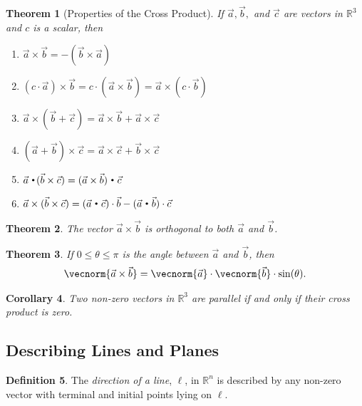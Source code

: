\documentclass{article}[11pt]
\newtheorem{theorem}{Theorem}[section]
\newtheorem{corollary}[theorem]{Corollary}
\theoremstyle{definition}
\newtheorem{definition}[theorem]{Definition}
\DeclareMathOperator*{\dotprod}{\scalerel*{\cdot}{\bigodot}}
\numberwithin{equation}{section}
\begin{document}
\begin{theorem}[Properties of the Cross Product]
	If \(\vec{a}, \vec{b},\) and \(\vec{c}\) are vectors in \( \mathbb{R}^3 \) and \(c\) is a scalar, then
	\begin{multicols}{2}
		\begin{enumerate}
			\item \( \vec{a} \times \vec{b}  = - (\vec{b} \times \vec{a}) \)
			\item \( (c\cdot\vec{a}) \times \vec{b} = c\cdot(\vec{a} \times \vec{b}) = \vec{a} \times (c\cdot \vec{b}) \)
			\item \( \vec{a} \times ( \vec{b} + \vec{c} ) = \vec{a} \times \vec{b} + \vec{a} \times \vec{c} \)
			\item \( (\vec{a} +  \vec{b}) \times \vec{c}  = \vec{a} \times \vec{c} + \vec{b} \times \vec{c} \)
			\item \( \vec{a} \dotprod ( \vec{b}\times\vec{c} ) = (\vec{a}\times\vec{b})\dotprod\vec{c} \)
			\item \( \vec{a} \times (\vec{b} \times \vec{c} ) = (\vec{a}\dotprod \vec{c})\cdot\vec{b} - (\vec{a}\dotprod\vec{b})\cdot\vec{c} \)
		\end{enumerate}
	\end{multicols}
\end{theorem}

\begin{theorem}
	The vector \( \vec{a}\times\vec{b} \) is orthogonal to both \(\vec{a}\) and \(\vec{b}\).
\end{theorem}

\begin{theorem}
	If \(0\leq \theta\leq \pi\) is the angle between \(\vec{a}\) and \(\vec{b}\), then
	\begin{align*}
		\vecnorm{\vec{a}\times \vec{b}}=\vecnorm{\vec{a}}\cdot\vecnorm{\vec{b}}\cdot\sin(\theta).
	\end{align*}
\end{theorem}

\begin{corollary}
	Two non-zero vectors in \(\mathbb{R}^3\) are parallel if and only if their cross product is zero.
\end{corollary}

\subsection{Describing Lines and Planes}

\begin{definition}
	The \emph{direction of a line}, \( \ell \), in \(\mathbb{R}^n\) is described by any non-zero vector with terminal and initial points lying on \(\ell\).
\end{definition}
\end{document}
